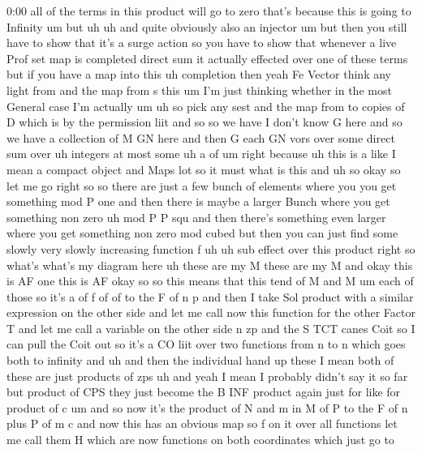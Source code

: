 \begin{unfinished}{0:00}
all  of  the  terms  in  this  product  will  go
to
zero  that's  because  this  is  going  to
Infinity
um
but
uh  uh  and  quite  obviously  also  an
injector  um  but  then  you  still  have  to
show  that  it's  a  surge  action  so  you
have  to  show  that  whenever  a  live  Prof
set  map  is  completed  direct  sum  it
actually  effected  over  one  of  these
terms  but  if  you  have  a  map  into  this
uh
completion  then  yeah
Fe
Vector  think
any  light
from  and  the  map  from  s
this
um  I'm  just  thinking  whether  in  the  most
General  case  I'm  actually
um  uh  so  pick  any  sest  and  the  map  from
to  copies  of
D  which  is  by  the  permission
liit  and
so
so  we  have  I  don't  know  G  here  and  so  we
have  a  collection  of  M  GN  here  and  then
G  each
GN  vors
over  some  direct  sum
over
uh
integers  at  most  some
uh  a
of  um
right  because  uh  this  is  a  like  I  mean  a
compact  object  and  Maps  lot  so  it
must  what  is
this
and
uh
so  okay  so  let  me  go  right  so  so
there  are  just  a  few  bunch  of  elements
where  you  you  get  something  mod  P  one
and  then  there  is  maybe  a  larger  Bunch
where  you  get  something  non  zero  uh  mod
P  P  squ  and  then  there's  something  even
larger  where  you  get  something  non  zero
mod  cubed  but  then  you  can  just  find
some
slowly  very  slowly  increasing  function  f
uh  uh  sub  effect  over  this  product
right  so  what's  what's  my  diagram  here
uh  these  are  my  M  these  are  my  M  and
okay  this  is  AF  one  this  is
AF
okay
so  so  this  means  that  this  tend  of  M  and
M  um  each  of  those  so  it's
a  of  f  of  of  to  the  F  of
n
p  and  then  I  take  Sol  product
with  a  similar  expression  on  the  other
side  and  let  me  call  now  this  function
for  the  other  Factor  T  and  let  me  call  a
variable  on  the  other  side
n
zp  and  the  S  TCT  canes  Coit  so  I  can
pull  the  Coit  out  so  it's  a  CO
liit  over  two
functions  from  n  to  n  which  goes  both  to
infinity  and  uh  and  then  the  individual
hand  up  these  I  mean  both  of  these  are
just  products  of  zps  uh
and  yeah  I
mean  I  probably  didn't  say  it  so  far  but
product  of  CPS  they  just  become  the  B
INF  product  again  just  for  like  for
product  of  c
um  and  so  now  it's  the  product  of  N  and
m  in  M  of  P  to  the  F  of  n  plus  P  of
m
c
and  now  this  has  an  obvious  map  so  f  on
it  over  all  functions  let  me  call  them  H
which  are  now  functions
on  both  coordinates  which  just  go  to

\end{unfinished}

